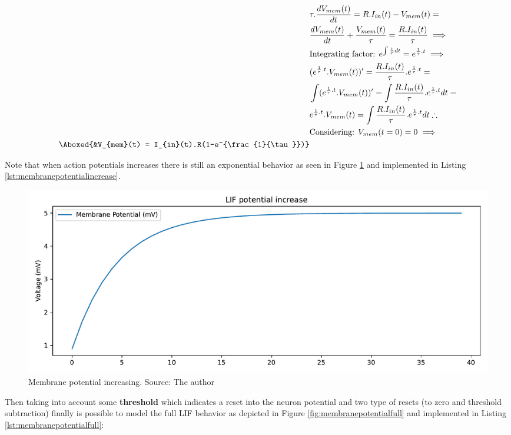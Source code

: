  			\begin{equation}
 				\label{eq:actionpotincrease}
 				\begin{aligned}
 					&\tau.\dfrac{dV_{mem}(t)}{dt} = R.I_{in}(t) - V_{mem}(t) = \\
 					&\dfrac{dV_{mem}(t)}{dt} + \frac{V_{mem}(t)}{\tau} = \frac{R.I_{in}(t)}{\tau} \implies \\
 					&\text{Integrating factor: } e^{\int \frac{1}{\tau} dt} = e^{\frac{1}{\tau}.t} \implies \\
					&(e^{\frac{1}{\tau}.t}.V_{mem}(t))' = \frac{R.I_{in}(t)}{\tau}.e^{\frac{1}{\tau}.t} = \\
					&\int (e^{\frac{1}{\tau}.t}.V_{mem}(t))' = \int \frac{R.I_{in}(t)}{\tau}.e^{\frac{1}{\tau}.t} dt = \\
					&e^{\frac{1}{\tau}.t}.V_{mem}(t) = \int \frac{R.I_{in}(t)}{\tau}.e^{\frac{1}{\tau}.t} dt \therefore \\
					& \text{Considering: } V_{mem}(t=0) = 0 \implies \\
					\Aboxed{&V_{mem}(t) = I_{in}(t).R(1-e^{\frac{1}{\tau}})}
 				\end{aligned}
 			\end{equation}
 		
 			\par Note that when action potentials increases there is still an exponential behavior as seen in Figure \ref{fig:membranepotentialincrease} and implemented in Listing \ref{lst:membranepotentialincrease}.
 			
 				

	 			\begin{figure}[H]
	 				\centering
	 				\includegraphics[width=\linewidth]{images/membranePotentialIncrease}
	 				\caption{Membrane potential increasing. Source: The author}
	 				\label{fig:membranepotentialincrease}
	 			\end{figure}
 		
 			\par Then taking into account some \textbf{threshold} which indicates a reset into the neuron potential and two type of resets (to zero and threshold subtraction) finally is possible to model the full LIF  behavior as depicted in Figure \ref{fig:membranepotentialfull} and implemented in Listing \ref{lst:membranepotentialfull}:
 			
